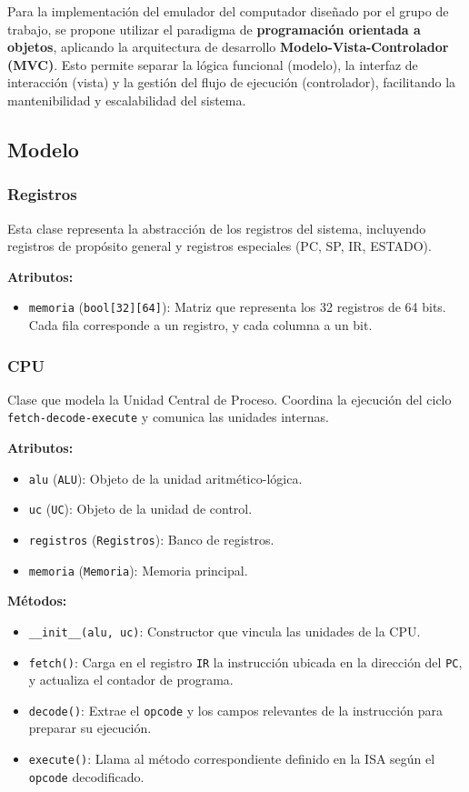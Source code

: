 \documentclass{article}
\begin{document}
Para la implementación del emulador del computador diseñado por el grupo de trabajo, se propone 
utilizar el paradigma de \textbf{programación orientada a objetos}, aplicando la arquitectura de 
desarrollo \textbf{Modelo-Vista-Controlador (MVC)}. Esto permite separar la lógica funcional 
(modelo), la interfaz de interacción (vista) y la gestión del flujo de ejecución (controlador), 
facilitando la mantenibilidad y escalabilidad del sistema.

\subsection{Modelo}

\subsubsection*{Registros}

Esta clase representa la abstracción de los registros del sistema, incluyendo registros de 
propósito general y registros especiales (PC, SP, IR, ESTADO).

\textbf{Atributos:}
\begin{itemize}
  \item \texttt{memoria} (\texttt{bool[32][64]}): Matriz que representa los 32 registros 
  de 64 bits. Cada fila corresponde a un registro, y cada columna a un bit.
\end{itemize}

\subsubsection*{CPU}

Clase que modela la Unidad Central de Proceso. Coordina la ejecución del ciclo 
\texttt{fetch-decode-execute} y comunica las unidades internas.

\textbf{Atributos:}
\begin{itemize}
  \item \texttt{alu} (\texttt{ALU}): Objeto de la unidad aritmético-lógica.
  \item \texttt{uc} (\texttt{UC}): Objeto de la unidad de control.
  \item \texttt{registros} (\texttt{Registros}): Banco de registros.
  \item \texttt{memoria} (\texttt{Memoria}): Memoria principal.
\end{itemize}

\textbf{Métodos:}
\begin{itemize}
  \item \texttt{\_\_init\_\_(alu, uc)}: Constructor que vincula las unidades de la CPU.
  \item \texttt{fetch()}: Carga en el registro \texttt{IR} la instrucción ubicada en la
      dirección del \texttt{PC}, y actualiza el contador de programa.
  \item \texttt{decode()}: Extrae el \texttt{opcode} y los campos relevantes de 
        la instrucción para preparar su ejecución.
  \item \texttt{execute()}: Llama al método correspondiente definido en la ISA 
        según el \texttt{opcode} decodificado.
\end{itemize}
\end{document}
